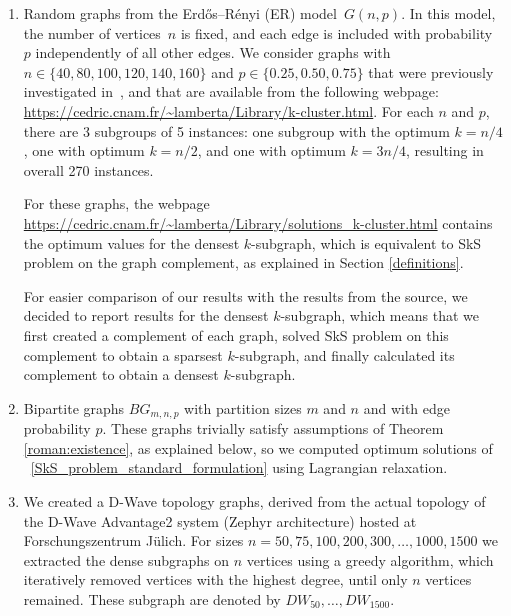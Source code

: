 \documentclass{article}
\begin{document}
\begin{enumerate}
\item Random graphs from the Erdős–Rényi (ER) model~$G(n, p)$. In this model, the number of vertices~$n$ is fixed, and each edge is included with probability~$p$ independently of all other edges. We consider graphs with $n \in \{40,80,100,120,140, 160\}$ and $p \in \{0.25, 0.50, 0.75 \}$ that were previously investigated in~\cite{Billionnet2005, Billionnet2009, Sotirov2020}, and that are available from the following webpage: \url{https://cedric.cnam.fr/~lamberta/Library/k-cluster.html}.
    For each $n$ and $p$, there are 3 subgroups of 5 instances: one subgroup with the optimum $k=n/4$, one with optimum $k=n/2$, and one with optimum $k=3n/4$,   resulting in overall 
270 instances.
    
    For these graphs, the webpage \url{https://cedric.cnam.fr/~lamberta/Library/solutions_k-cluster.html} contains the optimum values for the densest $k$-subgraph, which is equivalent to SkS problem on the graph complement, as explained in Section \ref{definitions}.
    
    
    For easier comparison of our results with the results from the source, we decided to report results for the densest $k$-subgraph, which means that we first created a complement of each graph, solved SkS problem on this complement to obtain a sparsest $k$-subgraph, and finally calculated its complement to obtain a densest $k$-subgraph.  

  
    \item Bipartite graphs $BG_{m,n,p}$ with partition
    sizes $m$ and $n$ and with edge probability $p$. These graphs trivially satisfy assumptions of Theorem \ref{roman:existence}, as explained below, so we computed optimum solutions of ~\eqref{SkS_problem_standard_formulation}
    using Lagrangian relaxation.

    \item We created a D-Wave topology graphs, derived from the actual topology of the D-Wave Advantage2 system (Zephyr architecture) hosted at Forschungszentrum Jülich. For sizes $n=50, 75, 100, 200, 300, \ldots, 1000, 1500$ we extracted the dense subgraphs on $n$ vertices  using a greedy algorithm, which iteratively removed vertices with the highest degree, until only $n$ vertices remained. These subgraph are denoted  
    by $DW_{50},\ldots,DW_{1500}$.
\end{enumerate}
\end{document}
